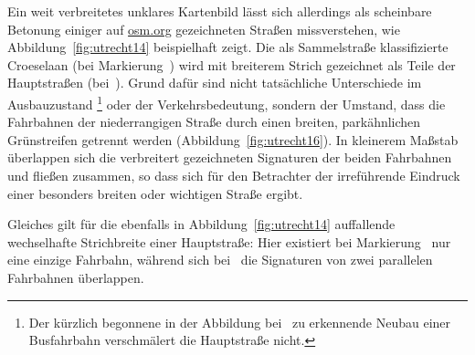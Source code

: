 \documentclass[../main/thesis.tex]{subfiles}
\begin{document}
\label{dual-highway-case-1}

Ein weit verbreitetes unklares Kartenbild lässt sich allerdings als scheinbare Betonung einiger auf \url{osm.org} gezeichneten Straßen missverstehen, wie Abbildung~\ref{fig:utrecht14} beispielhaft zeigt.
Die als Sammelstraße klassifizierte Croeselaan (bei Markierung~) wird mit breiterem Strich gezeichnet als Teile der Hauptstraßen (bei~).
Grund dafür sind nicht tatsächliche Unterschiede im Ausbauzustand%
\footnote{Der kürzlich begonnene in der Abbildung bei~ zu erkennende Neubau einer Busfahrbahn verschmälert die Hauptstraße nicht.}
oder der Verkehrsbedeutung, sondern der Umstand, dass die Fahrbahnen der niederrangigen Straße durch einen breiten, parkähnlichen Grünstreifen getrennt werden  (Abbildung~\ref{fig:utrecht16}).
In kleinerem Maßstab überlappen sich die verbreitert gezeichneten Signaturen der beiden Fahrbahnen und fließen zusammen, so dass sich für den Betrachter der irreführende Eindruck einer besonders breiten oder wichtigen Straße ergibt.

Gleiches gilt für die ebenfalls in Abbildung~\ref{fig:utrecht14} auffallende wechselhafte Strichbreite einer Hauptstraße:
Hier existiert bei Markierung~ nur eine einzige Fahrbahn, während sich bei~ die Signaturen von zwei parallelen Fahrbahnen überlappen.

\end{document}
